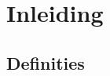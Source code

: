 \documentclass[tmi_notities.tex]{subfiles}
\begin{document}
\chapter{Inleiding}

\section{Definities}
\end{document}
